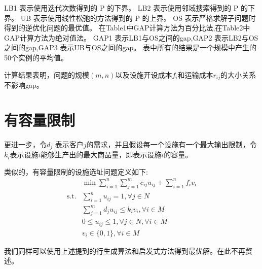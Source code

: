 \documentclass[UTF8]{article}
\begin{document}
LB1 表示使用迭代次数得到的 P 的下界。
LB2 表示使用邻域搜索得到的 P 的下界。
UB  表示使用线性松弛的方法得到的 P 的上界。
OS 表示严格求解子问题时得到的逆优化问题的最优值。
在Table1中GAP计算方法为百分比法,在Table2中GAP计算方法为绝对值法。
GAP1 表示LB1与OS之间的gap,GAP2 表示LB2与OS之间的gap,GAP3 表示UB与OS之间的gap。
表中所有的结果是一个规模中产生的50个实例的平均值。

计算结果表明，问题的规模$(m,n)$以及设施开设成本$f_i$和运输成本$r_{ij}$的大小关系不影响gap。

\section{有容量限制}

更进一步，令$d_j$ 表示客户$j$的需求，并且假设每一个设施有一个最大输出限制，令$k_i$表示设施$i$能够生产出的最大商品量，即表示设施$i$的容量。

类似的，有容量限制的设施选址问题定义如下:
\begin{align*}
&\min \sum_{i=1}^n \sum_{j=1}^m c_{ij}u_{ij} + \sum_{i=1}^n f_i v_i \\
\text{s.t.}& \sum_{i=1}^n u_{ij} =1, \forall j \in N  \\
&\sum_{j=1}^m d_j u_{ij}  \leq k_iv_i, \forall i \in M \\
& 0 \leq u_{ij} \leq 1,\forall j \in N, \forall i \in M \\
& v_{i} \in \{0,1\}, \forall i \in M
\end{align*}

我们同样可以使用上述提到的行生成算法和启发式方法得到最优解。在此不再赘述。
\end{document}
